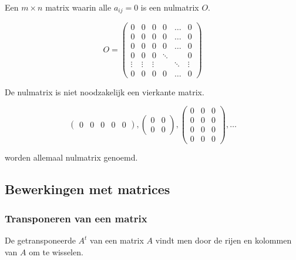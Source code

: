 \begin{itemize}
Een $m \times n$ matrix waarin alle $a_{ij}=0$ is een nulmatrix $O$. 

\[
O= \left( \begin{matrix}
0 & 0 & 0 & 0 & \ldots & 0 \\
0 & 0 & 0 & 0 & \ldots & 0 \\
0 & 0 & 0 & 0 & \ldots & 0 \\
0 & 0 & 0 & \ddots &  & 0 \\
\vdots & \vdots & \vdots &  & \ddots & \vdots \\
0 & 0 & 0 & 0 & \ldots & 0
\end{matrix} \right)
\]

\end{itemize}


\begin{opmerking}
	De nulmatrix is niet noodzakelijk een vierkante matrix.

\[  
\left( \begin{matrix}
0 & 0 & 0 & 0 & 0\end{matrix} \right) , \left( \begin{matrix} 
0 & 0 \\
0 & 0 \end{matrix} \right) , \left( \begin{matrix} 
0 & 0 & 0 \\
0 & 0 & 0 \\
0 & 0 & 0 \\
0 & 0 & 0 \end{matrix} \right) , \ldots                                            
\] 

worden allemaal nulmatrix genoemd.\\

\end{opmerking}

\subsection{Bewerkingen met matrices}

\subsubsection{Transponeren van een matrix}

De getransponeerde $A^t$ van een matrix $A$ vindt men door de rijen en kolommen van $A$ om te wisselen.\\

